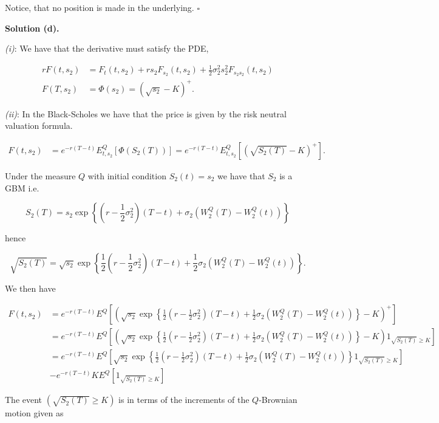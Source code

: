 \documentclass[
]{book}
\begin{document}
Notice, that no position is made in the underlying. \(\square\)

\noindent\makebox[\linewidth]{\rule{\textwidth}{0.4pt}}

\textbf{Solution (d).}

\emph{(i)}: We have that the derivative must satisfy the PDE,

\begin{align*}
rF(t,s_2)&=F_t(t,s_2)+rs_2F_{s_2}(t,s_2)+\frac{1}{2}\sigma_2^2s_2^2F_{s_2s_2}(t,s_2)\\
F(T,s_2)&=\Phi(s_2)=(\sqrt{s_2}-K)^+.
\end{align*}

\emph{(ii)}: In the Black-Scholes we have that the price is given by the risk neutral valuation formula.

\begin{align*}
F(t,s_2)&=e^{-r(T-t)}E^Q_{t,s_2}\left[\Phi(S_2(T))\right]=e^{-r(T-t)}E^Q_{t,s_2}\left[\left(\sqrt{S_2(T)}-K\right)^+\right].
\end{align*}

Under the measure \(Q\) with initial condition \(S_2(t)=s_2\) we have that \(S_2\) is a GBM i.e.

\[
S_2(T)=s_2\exp\left\{\left(r-\frac{1}{2}\sigma_2^2\right)(T-t)+\sigma_2(W_2^Q(T)-W_2^Q(t))\right\}
\]

hence

\[
\sqrt{S_2(T)}=\sqrt{s_2}\exp\left\{\frac{1}{2}\left(r-\frac{1}{2}\sigma_2^2\right)(T-t)+\frac{1}{2}\sigma_2(W_2^Q(T)-W_2^Q(t))\right\}.
\]

We then have

\begin{align*}
F(t,s_2)&=e^{-r(T-t)}E^Q\left[\left(\sqrt{s_2}\exp\left\{\frac{1}{2}\left(r-\frac{1}{2}\sigma_2^2\right)(T-t)+\frac{1}{2}\sigma_2(W_2^Q(T)-W_2^Q(t))\right\}-K\right)^+\right]\\
&=e^{-r(T-t)}E^Q\left[\left(\sqrt{s_2}\exp\left\{\frac{1}{2}\left(r-\frac{1}{2}\sigma_2^2\right)(T-t)+\frac{1}{2}\sigma_2(W_2^Q(T)-W_2^Q(t))\right\}-K\right)1_{\sqrt{S_2(T)}\ge K}\right]\\
&=e^{-r(T-t)}E^Q\left[\sqrt{s_2}\exp\left\{\frac{1}{2}\left(r-\frac{1}{2}\sigma_2^2\right)(T-t)+\frac{1}{2}\sigma_2(W_2^Q(T)-W_2^Q(t))\right\}1_{\sqrt{S_2(T)}\ge K}\right]\\
&-e^{-r(T-t)}KE^Q\left[1_{\sqrt{S_2(T)}\ge K}\right]
\end{align*}

The event \((\sqrt{S_2(T)}\ge K)\) is in terms of the increments of the \(Q\)-Brownian motion given as
\end{document}
